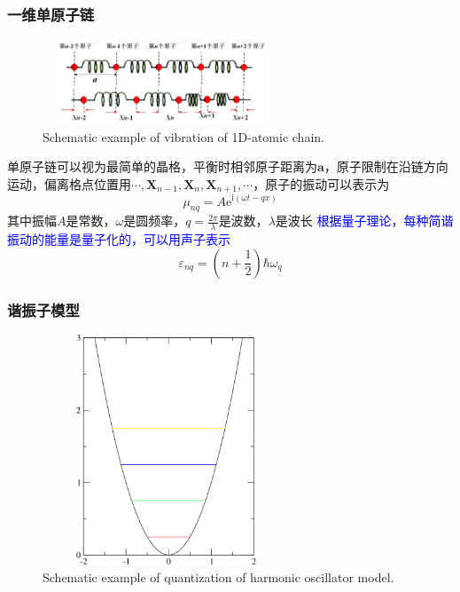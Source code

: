 {\frame
{
	\frametitle{一维单原子链}
\begin{figure}[h!]
\centering
\vspace*{-0.25in}
\includegraphics[height=1.0in,width=2.8in,viewport=0 0 1400 500,clip]{Figures/virbration.png}
\caption{\tiny \textrm{Schematic example of vibration of 1D-atomic chain.}}%
\label{virbration}
\end{figure} 
单原子链可以视为最简单的晶格，平衡时相邻原子距离为$\mathbf{a}$，原子限制在沿链方向运动，偏离格点位置用$\cdots,\mathbf{X}_{n-1},\mathbf{X}_{n},\mathbf{X}_{n+1},\cdots$，原子的振动可以表示为
\begin{displaymath}
	\mu_{nq}=A\mathrm{e}^{\mathrm{i}(\omega t-qx)}
\end{displaymath}
其中振幅$A$是常数，$\omega$是圆频率，$q=\tfrac{2\pi}{\lambda}$是波数，$\lambda$是波长
\vskip 5pt
\textcolor{blue}{根据量子理论，每种简谐振动的能量是量子化的，可以用声子表示}
\begin{displaymath}
	\varepsilon_{nq}=\left( n+\frac12 \right)\hbar\omega_q
\end{displaymath}
}

\frame
{
	\frametitle{谐振子模型}
\begin{figure}[h!]
\centering
\vspace*{-0.15in}
\includegraphics[height=2.7in,width=2.9in,viewport=0 0 650 800,clip]{Figures/Quantum-viberation.png}
\caption{\tiny \textrm{Schematic example of quantization of  harmonic oscillator model.}}%
\label{Harmonic-oscillator-model}
\end{figure} 
}

}
